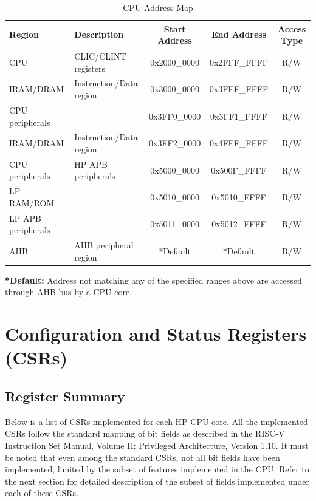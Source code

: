 \documentclass[main\_\_EN.tex]{subfiles}
\begin{document}
\begin{longtable}{| l| l |c | c | c  |}
\caption{CPU Address Map} \label{tab:riscvcpu-mem-blocks}
\\ \hline
\rowcolor{lightgray}
\textbf{Region} & \textbf{Description}    & \textbf{Start Address}  & \textbf{End Address}  & \textbf{Access Type}   \\ \hline
CPU \label{cpu} &  CLIC/CLINT registers &      0x2000\_0000  &  0x2FFF\_FFFF  &  R/W  \\ \hline
IRAM/DRAM\label{ram} & Instruction/Data region &   0x3000\_0000  &  0x3FEF\_FFFF  &  R/W  \\ \hline
CPU peripherals \label{cpu_peri} &   &      0x3FF0\_0000  &  0x3FF1\_FFFF  &  R/W  \\ \hline
IRAM/DRAM\label{ram2} & Instruction/Data region &   0x3FF2\_0000  &  0x4FFF\_FFFF  &  R/W  \\ \hline
CPU peripherals \label{cpu_peri2} & HP APB peripherals  &   0x5000\_0000  &  0x500F\_FFFF  &  R/W  \\ \hline
LP RAM/ROM \label{lpram} &  &   0x5010\_0000  &  0x5010\_FFFF  &  R/W  \\ \hline
LP APB peripherals \label{lpapb} &   &   0x5011\_0000  &  0x5012\_FFFF  &  R/W  \\ \hline
AHB\label{sysahb} & AHB peripheral region &      *Default  &  *Default  &  R/W  \\ \hline
\end{longtable}

\textbf{*Default:} Address not matching any of the specified ranges above are accessed through AHB bus by a CPU core.


\section{Configuration and Status Registers (CSRs)}
\hypertarget{riscvcpu-cpu-reg-summ}{}
\subsection{Register Summary}
\label{sec:riscvcpu-cpu-reg-summ}

Below is a list of CSRs implemented for each HP CPU core. All the implemented CSRs follow the standard mapping of bit fields as described in the RISC-V Instruction Set Manual, Volume II: Privileged Architecture, Version 1.10. It must be noted that even among the standard CSRs, not all bit fields have been implemented, limited by the subset of features implemented in the CPU. Refer to the next section for detailed description of the subset of fields implemented under each of these CSRs.
\end{document}
